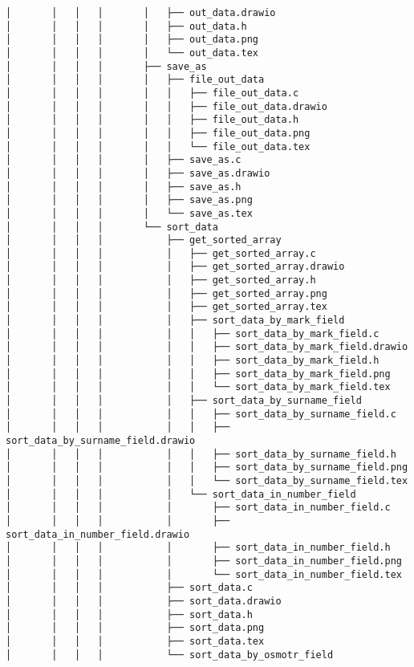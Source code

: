 \begin{verbatim}
│       │   │   │       │   ├── out_data.drawio
│       │   │   │       │   ├── out_data.h
│       │   │   │       │   ├── out_data.png
│       │   │   │       │   └── out_data.tex
│       │   │   │       ├── save_as
│       │   │   │       │   ├── file_out_data
│       │   │   │       │   │   ├── file_out_data.c
│       │   │   │       │   │   ├── file_out_data.drawio
│       │   │   │       │   │   ├── file_out_data.h
│       │   │   │       │   │   ├── file_out_data.png
│       │   │   │       │   │   └── file_out_data.tex
│       │   │   │       │   ├── save_as.c
│       │   │   │       │   ├── save_as.drawio
│       │   │   │       │   ├── save_as.h
│       │   │   │       │   ├── save_as.png
│       │   │   │       │   └── save_as.tex
│       │   │   │       └── sort_data
│       │   │   │           ├── get_sorted_array
│       │   │   │           │   ├── get_sorted_array.c
│       │   │   │           │   ├── get_sorted_array.drawio
│       │   │   │           │   ├── get_sorted_array.h
│       │   │   │           │   ├── get_sorted_array.png
│       │   │   │           │   ├── get_sorted_array.tex
│       │   │   │           │   ├── sort_data_by_mark_field
│       │   │   │           │   │   ├── sort_data_by_mark_field.c
│       │   │   │           │   │   ├── sort_data_by_mark_field.drawio
│       │   │   │           │   │   ├── sort_data_by_mark_field.h
│       │   │   │           │   │   ├── sort_data_by_mark_field.png
│       │   │   │           │   │   └── sort_data_by_mark_field.tex
│       │   │   │           │   ├── sort_data_by_surname_field
│       │   │   │           │   │   ├── sort_data_by_surname_field.c
│       │   │   │           │   │   ├── sort_data_by_surname_field.drawio
│       │   │   │           │   │   ├── sort_data_by_surname_field.h
│       │   │   │           │   │   ├── sort_data_by_surname_field.png
│       │   │   │           │   │   └── sort_data_by_surname_field.tex
│       │   │   │           │   └── sort_data_in_number_field
│       │   │   │           │       ├── sort_data_in_number_field.c
│       │   │   │           │       ├── sort_data_in_number_field.drawio
│       │   │   │           │       ├── sort_data_in_number_field.h
│       │   │   │           │       ├── sort_data_in_number_field.png
│       │   │   │           │       └── sort_data_in_number_field.tex
│       │   │   │           ├── sort_data.c
│       │   │   │           ├── sort_data.drawio
│       │   │   │           ├── sort_data.h
│       │   │   │           ├── sort_data.png
│       │   │   │           ├── sort_data.tex
│       │   │   │           └── sort_data_by_osmotr_field

\end{verbatim}
